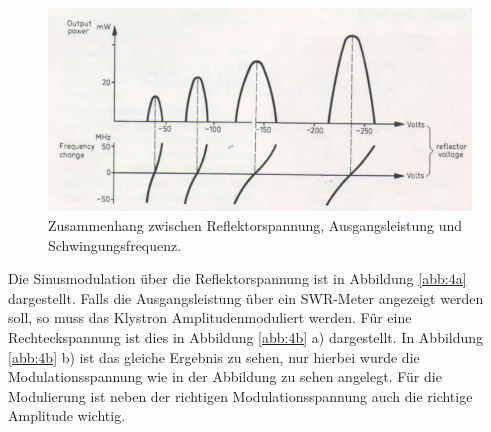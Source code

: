 \begin{figure}
  \centering
  \includegraphics[scale=0.4]{Graph1.png}
  \caption{Zusammenhang zwischen Reflektorspannung, Ausgangsleistung und
  Schwingungsfrequenz. \cite{Q1}}
  \label{abb:3}
\end{figure}

Die Sinusmodulation über die Reflektorspannung ist in Abbildung \ref{abb:4a}
dargestellt.
Falls die Ausgangsleistung über ein SWR-Meter angezeigt werden soll, so muss das
Klystron Amplitudenmoduliert werden. Für eine Rechteckspannung ist dies in
Abbildung \ref{abb:4b} a) dargestellt. In Abbildung \ref{abb:4b} b) ist das
gleiche Ergebnis zu sehen, nur hierbei wurde die Modulationsspannung wie in der
Abbildung zu sehen angelegt. Für die Modulierung ist neben der richtigen
Modulationsspannung auch die richtige Amplitude wichtig.

